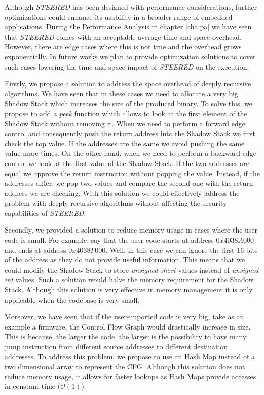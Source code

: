 Although \textit{STEERED} has been designed with performance considerations, further
optimizations could enhance its usability in a broader range of embedded applications.
During the Performance Analysis in chapter \ref{cha:pa} we have seen that
\textit{STEERED} comes with an acceptable average time and space overhead.
However, there are edge cases where this is not true and the overhead grows exponentially.
In future works we plan to provide optimization solutions to cover such cases
lowering the time and space impact of \textit{STEERED} on the execution.

Firstly, we propose a solution to address the space overhead of deeply recursive
algorithms. We have seen that in these cases we need to allocate a very big Shadow
Stack which increases the size of the produced binary. To solve this, we propose
to add a \textit{peek} function which allows to look at the first element of the
Shadow Stack without removing it. When we need to perform a forward edge control
and consequently push the return address into the Shadow Stack we first check the
top value. If the addresses are the same we avoid pushing the same value more
times. On the other hand, when we need to perform a backward edge control we
look at the first value of the Shadow Stack. If the two addresses are equal we approve
the return instruction without popping the value. Instead, if the addresses differ,
we pop two values and compare the second one with the return address we are
checking. With this solution we could effectively address the problem with deeply
recursive algorithms without affecting the security capabilities of \textit{STEERED}.

Secondly, we provided a solution to reduce memory usage in cases where the user code
is small. For example, say that the user code starts at address $0x4038A000$ and
ends at address $0x4038F000$. Well, in this case we can ignore the first $16$ bits
of the address as they do not provide useful information. This means that we
could modify the Shadow Stack to store \textit{unsigned short} values instead of
\textit{unsigned int} values. Such a solution would halve the memory requirement
for the Shadow Stack. Although this solution is very effective in memory
management it is only applicable when the codebase is very small.

Moreover, we have seen that if the user-imported code is very big, take as an
example a firmware, the Control Flow Graph would drastically increase in size.
This is because, the larger the code, the larger is the possibility to have many
jump instruction from different source addresses to different destination
addresses. To address this problem, we propose to use an Hash Map instead of a
two dimensional array to represent the CFG. Although this solution does not reduce
memory usage, it allows for faster lookups as Hash Maps provide accesses in
constant time ($\mathcal{O}(1)$).

